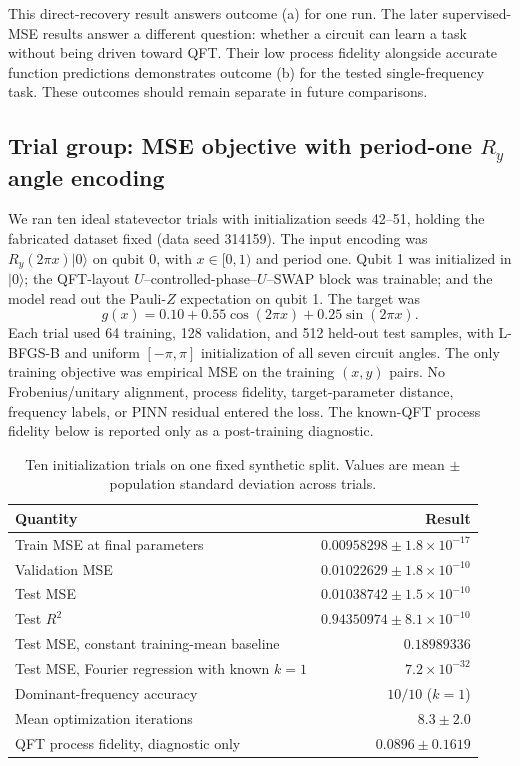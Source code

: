 \documentclass[11pt]{article}
\newcommand{\ket}[1]{\lvert #1\rangle}
\begin{document}
This direct-recovery result answers outcome (a) for one run. The later supervised-MSE results answer a different question: whether a circuit can learn a task without being driven toward QFT. Their low process fidelity alongside accurate function predictions demonstrates outcome (b) for the tested single-frequency task. These outcomes should remain separate in future comparisons.

\subsection{Trial group: MSE objective with period-one $R_y$ angle encoding}

We ran ten ideal statevector trials with initialization seeds 42--51, holding the fabricated dataset fixed (data seed 314159). The input encoding was $R_y(2\pi x)\ket{0}$ on qubit 0, with $x\in[0,1)$ and period one. Qubit 1 was initialized in $\ket{0}$; the QFT-layout $U$--controlled-phase--$U$--SWAP block was trainable; and the model read out the Pauli-$Z$ expectation on qubit 1. The target was
\begin{equation}
  g(x)=0.10+0.55\cos(2\pi x)+0.25\sin(2\pi x).
\end{equation}
Each trial used 64 training, 128 validation, and 512 held-out test samples, with L-BFGS-B and uniform $[-\pi,\pi]$ initialization of all seven circuit angles. The only training objective was empirical MSE on the training $(x,y)$ pairs. No Frobenius/unitary alignment, process fidelity, target-parameter distance, frequency labels, or PINN residual entered the loss. The known-QFT process fidelity below is reported only as a post-training diagnostic.

\begin{table}[ht]
\centering
\caption{Ten initialization trials on one fixed synthetic split. Values are mean $\pm$ population standard deviation across trials.}
\begin{tabular}{@{}lr@{}}
\toprule
Quantity & Result \\
\midrule
Train MSE at final parameters & $0.00958298 \pm 1.8\times10^{-17}$ \\
Validation MSE & $0.01022629 \pm 1.8\times10^{-10}$ \\
Test MSE & $0.01038742 \pm 1.5\times10^{-10}$ \\
Test $R^2$ & $0.94350974 \pm 8.1\times10^{-10}$ \\
Test MSE, constant training-mean baseline & $0.18989336$ \\
Test MSE, Fourier regression with known $k=1$ & $7.2\times10^{-32}$ \\
Dominant-frequency accuracy & $10/10$ ($k=1$) \\
Mean optimization iterations & $8.3 \pm 2.0$ \\
QFT process fidelity, diagnostic only & $0.0896 \pm 0.1619$ \\
\bottomrule
\end{tabular}
\end{table}
\end{document}
